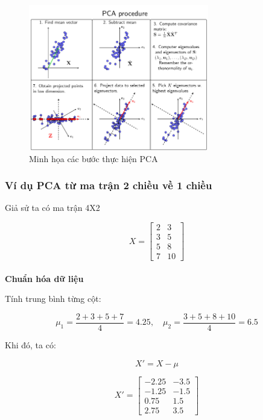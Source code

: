 \begin{figure}[H]
    \centering
    \includegraphics[width=0.7\textwidth]{img/mathPCA.png}
    \caption{Minh họa các bước thực hiện PCA}
    \label{fig:PCA_steps}
\end{figure}





\subsubsection{Ví dụ PCA từ ma trận 2 chiều về 1 chiều}

Giả sử ta có ma trận 4X2 

\[
X =
\begin{bmatrix}
2 & 3 \\
3 & 5 \\
5 & 8 \\
7 & 10
\end{bmatrix}
\]

\paragraph{}{\textbf{Chuẩn hóa dữ liệu}}

Tính trung bình từng cột:

\[
\mu_1 = \frac{2+3+5+7}{4} = 4.25, \quad \mu_2 = \frac{3+5+8+10}{4} = 6.5
\]

Khi đó, ta có:

\[
X' = X - \mu
\]

\[
X' =
\begin{bmatrix}
-2.25 & -3.5 \\
-1.25 & -1.5 \\
0.75 & 1.5 \\
2.75 & 3.5
\end{bmatrix}
\]

